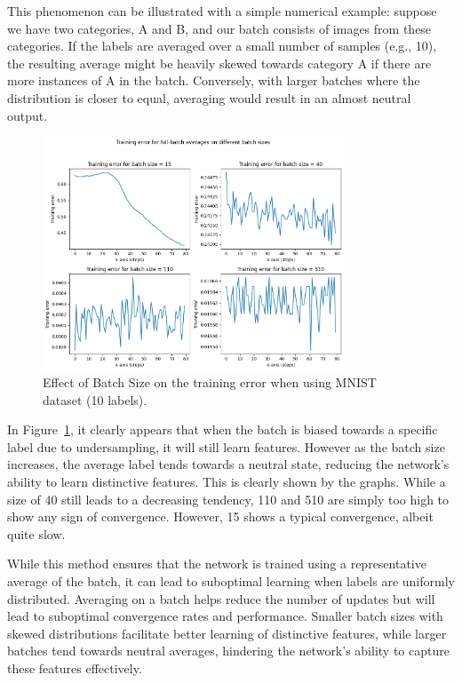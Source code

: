 \documentclass[english]{article}
\begin{document}
This phenomenon can be illustrated with a simple numerical example: suppose we have two categories, A and B, and our batch consists of images from these categories. If the labels are averaged over a small number of samples (e.g., 10), the resulting average might be heavily skewed towards category A if there are more instances of A in the batch. Conversely, with larger batches where the distribution is closer to equal, averaging would result in an almost neutral output.

\begin{figure}[ht]
    \centering
    \includegraphics[width=0.8\textwidth]{rsc/full-batch-avg/2x2_TE_grid.png}
    \caption{Effect of Batch Size on the training error when using MNIST dataset (10 labels).}
    \label{fig:batch_size_effect}
\end{figure}

In Figure~\ref{fig:batch_size_effect}, it clearly appears that when the batch is biased towards a specific label due to  undersampling, it will still learn features. However as the batch size increases, the average label tends towards a neutral state, reducing the network's ability to learn distinctive features. This is clearly shown by the graphs. While a size of 40 still leads to a decreasing tendency, 110 and 510 are simply too high to show any sign of convergence. However, 15 shows a typical convergence, albeit quite slow.

While this method ensures that the network is trained using a representative average of the batch, it can lead to suboptimal learning when labels are uniformly distributed. Averaging on a batch helps reduce the number of updates but will lead to suboptimal convergence rates and performance. Smaller batch sizes with skewed distributions facilitate better learning of distinctive features, while larger batches tend towards neutral averages, hindering the network's ability to capture these features effectively.    
\end{document}
